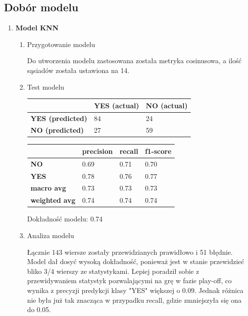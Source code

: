 \documentclass{article}
\begin{document}
    \subsection{Dobór modelu}
    \begin{enumerate}
    \item \textbf{Model KNN}
    \begin{enumerate}
        \item Przygotowanie modelu

        Do utworzenia modelu zastosowana została metryka cosinusowa, a ilość sąsiadów została ustawiona na 14.
        
        \item Test modelu
        \begin{table}[H]
            \centering
            \begin{tabular}{|l|l|l|}
            \hline
             & \textbf{YES (actual)} & \textbf{NO (actual)}  \\ \hline
            \textbf{YES (predicted)} & 84 & 24 \\ \hline
            \textbf{NO (predicted)} & 27 & 59  \\ \hline
            \end{tabular}
        \end{table}
 \newpage        
        \begin{table}[H]
            \centering
            \begin{tabular}{|l|l|l|l|}
            \hline
            & \textbf{precision} & \textbf{recall} & \textbf{f1-score}  \\ \hline
            \textbf{NO} & 0.69 & 0.71 & 0.70 \\ \hline
            \textbf{YES} & 0.78 & 0.76 & 0.77 \\ \hline
            \textbf{macro avg} & 0.73 & 0.73 & 0.73 \\ \hline
            \textbf{weighted avg} & 0.74 & 0.74 & 0.74 \\ \hline
            \end{tabular}
        \end{table}
        Dokładność modelu: 0.74
        \item Analiza modelu
        
        Łącznie 143 wiersze zostały przewidzianych prawidłowo i 51 błędnie. Model dał dosyć wysoką dokładność, ponieważ jest w stanie przewidzieć bliko 3/4 wierszy ze statystykami. Lepiej poradził sobie z przewidywaniem statystyk pozwalającymi na grę w fazie play-off, co wynika z precyzji predykcji klasy "YES" większej o 0.09. Jednak różnica nie była już tak znacząca w przypadku recall, gdzie zmniejszyła się ona do 0.05.
    \end{enumerate}


\end{enumerate}
\end{document}

